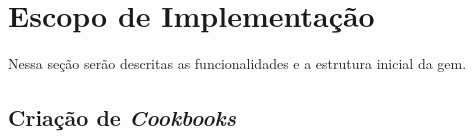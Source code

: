 \section{Escopo de Implementação}
Nessa seção serão descritas as funcionalidades e a estrutura inicial da gem.


\subsection{Criação de \textit{Cookbooks}}
